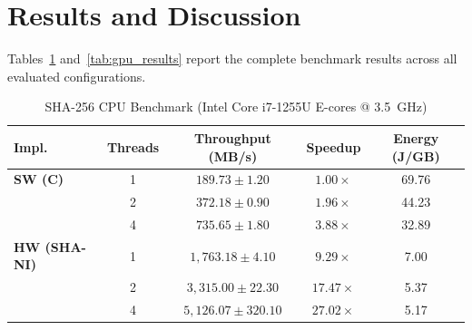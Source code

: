\section{Results and Discussion}
\label{sec:results}

Tables~\ref{tab:cpu_results} and~\ref{tab:gpu_results} report the complete benchmark results across all evaluated configurations.

\begin{table}[htbp]
\centering
\caption{SHA-256 CPU Benchmark (Intel Core i7-1255U E-cores @ 3.5~GHz)}
\label{tab:cpu_results}
\begin{tabular}{lcccc}
\hline\hline
\textbf{Impl.} & \textbf{Threads} & \textbf{Throughput (MB/s)} & \textbf{Speedup} & \textbf{Energy (J/GB)} \\
\hline
\textbf{SW (C)} & 1 & $189.73 \pm 1.20$ & $1.00\times$ & 69.76 \\
                & 2 & $372.18 \pm 0.90$ & $1.96\times$ & 44.23 \\
                & 4 & $735.65 \pm 1.80$ & $3.88\times$ & 32.89 \\
\hline
\textbf{HW (SHA-NI)} & 1 & $1,763.18 \pm 4.10$ & $9.29\times$ & 7.00 \\
                     & 2 & $3,315.00 \pm 22.30$ & $17.47\times$ & 5.37 \\
                     & 4 & $5,126.07 \pm 320.10$ & $27.02\times$ & 5.17 \\
\hline\hline
\end{tabular}
\end{table}

